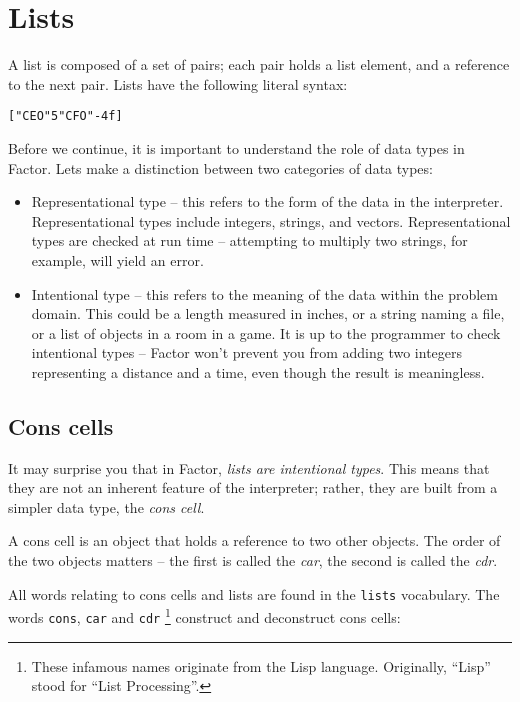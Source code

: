 \documentclass[english]{article}
\begin{document}
\section{Lists}

A list is composed of a set of pairs; each pair holds a list element,
and a reference to the next pair. Lists have the following literal
syntax:

\begin{alltt}
{[} "CEO" 5 "CFO" -4 f {]}
\end{alltt}
Before we continue, it is important to understand the role of data
types in Factor. Lets make a distinction between two categories of
data types:

\begin{itemize}
\item Representational type -- this refers to the form of the data in the
interpreter. Representational types include integers, strings, and
vectors. Representational types are checked at run time -- attempting
to multiply two strings, for example, will yield an error.
\item Intentional type -- this refers to the meaning of the data within
the problem domain. This could be a length measured in inches, or
a string naming a file, or a list of objects in a room in a game.
It is up to the programmer to check intentional types -- Factor won't
prevent you from adding two integers representing a distance and a
time, even though the result is meaningless.
\end{itemize}

\subsection{Cons cells}

It may surprise you that in Factor, \emph{lists are intentional types}.
This means that they are not an inherent feature of the interpreter;
rather, they are built from a simpler data type, the \emph{cons cell}.

A cons cell is an object that holds a reference to two other objects.
The order of the two objects matters -- the first is called the \emph{car},
the second is called the \emph{cdr}.

All words relating to cons cells and lists are found in the \texttt{lists}
vocabulary. The words \texttt{cons}, \texttt{car} and \texttt{cdr}%
\footnote{These infamous names originate from the Lisp language. Originally,
{}``Lisp'' stood for {}``List Processing''.%
} construct and deconstruct cons cells:
\end{document}
